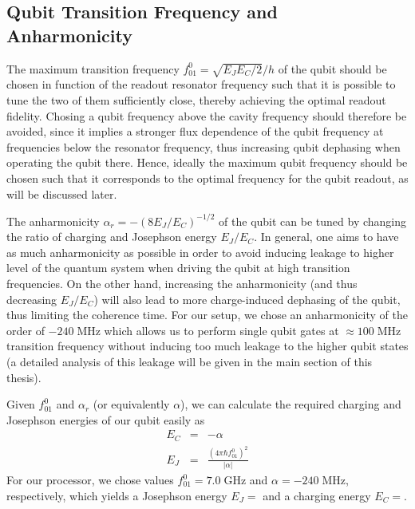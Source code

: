 \subsection{Qubit Transition Frequency and Anharmonicity}

The maximum transition frequency $f_{01}^0 = \sqrt{E_J E_C/2}/h$  of the qubit should be chosen in function of the readout resonator frequency such that it is possible to tune the two of them sufficiently close, thereby achieving the optimal readout fidelity. Chosing a qubit frequency above the cavity frequency should therefore be avoided, since it implies a stronger flux dependence of the qubit frequency at frequencies below the resonator frequency, thus increasing qubit dephasing when operating the qubit there. Hence, ideally the maximum qubit frequency should be chosen such that it corresponds to the optimal frequency for the qubit readout, as will be discussed later.

\smallskip

The anharmonicity $\alpha_r=-(8E_J/E_C)^{-1/2}$ of the qubit can be tuned by changing the ratio of charging and Josephson energy $E_J/E_C$. In general, one aims to have as much anharmonicity as possible in order to avoid inducing leakage to higher level of the quantum system when driving the qubit at high transition frequencies. On the other hand, increasing the anharmonicity (and thus decreasing $E_J/E_C$) will also lead to more charge-induced dephasing of the qubit, thus limiting the coherence time. For our setup, we chose an anharmonicity of the order of $-240\;\mathrm{MHz}$ which allows us to perform single qubit gates at $\approx 100 \;\mathrm{MHz}$ transition frequency without inducing too much leakage to the higher qubit states (a detailed analysis of this leakage will be given in the main section of this thesis). 

\smallskip

Given $f_{01}^0$ and $\alpha_r$ (or equivalently $\alpha$), we can calculate the required charging and Josephson energies of our qubit easily as
%
\begin{eqnarray}
E_C & = & -\alpha \\
E_J & = & \frac{(4\pi\hbar f_{01}^0)^2}{|\alpha|}
\end{eqnarray}
%
For our processor, we chose values $f_{01}^0=7.0\;\mathrm{GHz}$ and $\alpha=-240\;\mathrm{MHz}$, respectively, which yields a Josephson energy $E_J=$ and a charging energy $E_C=$.

\smallskip

